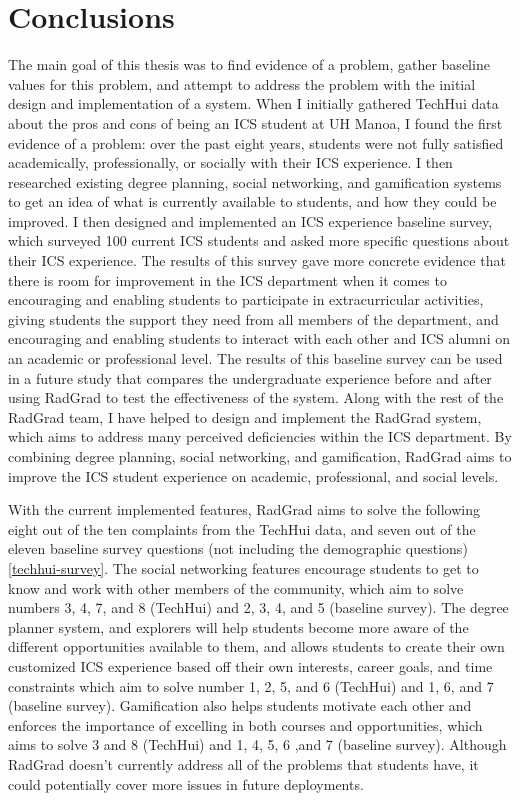 \chapter{Conclusions}

The main goal of this thesis was to find evidence of a problem, gather baseline values for this problem, and attempt to address the problem with the initial design and implementation of a system. When I initially gathered TechHui data about the pros and cons of being an ICS student at UH Manoa, I found the first evidence of a problem: over the past eight years, students were not fully satisfied academically, professionally, or socially with their ICS experience. I then researched existing degree planning, social networking, and gamification systems to get an idea of what is currently available to students, and how they could be improved. I then designed and implemented an ICS experience baseline survey, which surveyed 100 current ICS students and asked more specific questions about their ICS experience. The results of this survey gave more concrete evidence that there is room for improvement in the ICS department when it comes to encouraging and enabling students to participate in extracurricular activities, giving students the support they need from all members of the department, and encouraging and enabling students to interact with each other and ICS alumni on an academic or professional level. The results of this baseline survey can be used in a future study that compares the undergraduate experience before and after using RadGrad to test the effectiveness of the system. Along with the rest of the RadGrad team, I have helped to design and implement the RadGrad system, which aims to address many perceived deficiencies within the ICS department. By combining degree planning, social networking, and gamification, RadGrad aims to improve the ICS student experience on academic, professional, and social levels. 

With the current implemented features, RadGrad aims to solve the following eight out of the ten complaints from the TechHui data, and seven out of the eleven baseline survey questions (not including the demographic questions) \ref{techhui-survey}. The social networking features encourage students to get to know and work with other members of the community, which aim to solve numbers 3, 4, 7, and 8 (TechHui) and 2, 3, 4, and 5 (baseline survey). The degree planner system, and explorers will help students become more aware of the different opportunities available to them, and allows students to create their own customized ICS experience based off their own interests, career goals, and time constraints which aim to solve number 1, 2, 5, and 6 (TechHui) and 1, 6, and 7 (baseline survey). Gamification also helps students motivate each other and enforces the importance of excelling in both courses and opportunities, which aims to solve 3 and 8 (TechHui) and 1, 4, 5, 6 ,and 7 (baseline survey). Although RadGrad doesn't currently address all of the problems that students have, it could potentially cover more issues in future deployments. 

